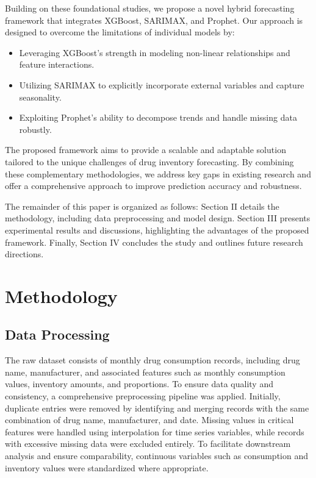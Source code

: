 \documentclass[journal]{IEEEtran}
\begin{document}
Building on these foundational studies, we propose a novel hybrid forecasting framework that integrates XGBoost, SARIMAX, and Prophet. Our approach is designed to overcome the limitations of individual models by:

\begin{itemize}
    \item Leveraging XGBoost's strength in modeling non-linear relationships and feature interactions.
    \item Utilizing SARIMAX to explicitly incorporate external variables and capture seasonality.
    \item Exploiting Prophet's ability to decompose trends and handle missing data robustly.
\end{itemize}

The proposed framework aims to provide a scalable and adaptable solution tailored to the unique challenges of drug inventory forecasting. By combining these complementary methodologies, we address key gaps in existing research and offer a comprehensive approach to improve prediction accuracy and robustness.

The remainder of this paper is organized as follows: Section II details the methodology, including data preprocessing and model design. Section III presents experimental results and discussions, highlighting the advantages of the proposed framework. Finally, Section IV concludes the study and outlines future research directions.

\section{Methodology}
\subsection{Data Processing}

The raw dataset consists of monthly drug consumption records, including drug name, manufacturer, and associated features such as monthly consumption values, inventory amounts, and proportions. To ensure data quality and consistency, a comprehensive preprocessing pipeline was applied. Initially, duplicate entries were removed by identifying and merging records with the same combination of drug name, manufacturer, and date. Missing values in critical features were handled using interpolation for time series variables, while records with excessive missing data were excluded entirely. To facilitate downstream analysis and ensure comparability, continuous variables such as consumption and inventory values were standardized where appropriate.
\end{document}
